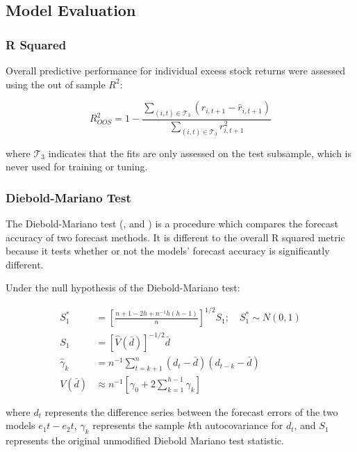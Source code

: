 \documentclass[a4paper, table]{article}
\begin{document}
\subsection{Model Evaluation}
\label{model_evaluation}

\subsubsection{R Squared}

Overall predictive performance for individual excess stock returns were assessed using the out of sample $R^2$:

\begin{equation}
	R^2_{OOS} = 1 - \frac{\sum_{(i, t)\in\mathcal{T}_3}(r_{i, t+1} - \widehat{r}_{i, t+1})}{\sum_{(i, t)\in\mathcal{T}_3}r_{i, t+1}^2}
\end{equation}

where $\mathcal{T}_3$ indicates that the fits are only assessed on the test subsample, which is never used for training or tuning. 

\subsubsection{Diebold-Mariano Test}

The Diebold-Mariano test (\cite{diebold_comparing_1995}, and \cite{harvey_testing_1997}) is a procedure which compares the forecast accuracy of two forecast methods. It is different to the overall R squared metric because it tests whether or not the models' forecast accuracy is significantly different. 

Under the null hypothesis of the Diebold-Mariano test:

\begin{align}
	S_1^* &= \left[ 
		\frac{n + 1 - 2h + n^{-1}h(h-1)}
			{n} 
	\right]^{1/2}S_1 ; \quad S_1^* \sim N(0,1) \\
	S_1 &= \left[ 
		\hat{V}(\bar{d})
	\right] ^{-1/2}\bar{d} \\
	\hat{\gamma}_k &= n^{-1} \sum_{t = k + 1}^{n}(d_t - \bar{d})(d_{t-k} - \bar{d}) \\
	V(\bar{d}) &\approx n^{-1}\left[ 
		\gamma_0 + 2 \sum_{k = 1}^{h - 1}\gamma_k
	\right] 
\end{align}

where $d_t$ represents the difference series between the forecast errors of the two models $e_1t - e_2t$, $\hat{\gamma}_k$ represents the sample $k$th autocovariance for $d_t$, and $S_1$ represents the original unmodified Diebold Mariano test statistic.
\end{document}
